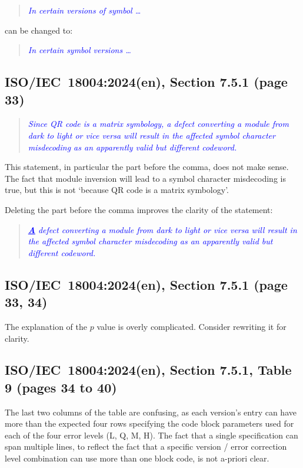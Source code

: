 \documentclass[a4paper,twoside]{article}
\newcommand{\shortstandard}{ISO/IEC~18004}
\newcommand{\standard}{\shortstandard:2024(en)}
\newcommand{\quotestandard}[1]{\textcolor{blue}{\textit{#1}}}
\newcommand{\ddd}{\dots}
\newcommand{\change}[1]{\underline{\textbf{#1}}}
\begin{document}
\begin{quote}
\quotestandard{In certain versions of symbol \ddd}
\end{quote}

can be changed to:

\begin{quote}
\quotestandard{In certain {symbol versions} \ddd}
\end{quote}

\subsection{\standard, Section 7.5.1 (page 33)}

\begin{quote}
\quotestandard{Since QR code is a matrix symbology, a defect converting a module from dark to light or vice versa
will result in the affected symbol character misdecoding as an apparently valid but different codeword.}
\end{quote}

This statement, in particular the part before the comma, does not make sense. The fact that module
inversion will lead to a symbol character misdecoding is true, but this is not `because QR code is a
matrix symbology'.

Deleting the part before the comma improves the clarity of the statement:

\begin{quote}
\quotestandard{\change{A} defect converting a module from dark to light or vice versa will result in the affected symbol
character misdecoding as an apparently valid but different codeword.}
\end{quote}

\subsection{\standard, Section 7.5.1 (page 33, 34)}

The explanation of the $p$ value is overly complicated. Consider rewriting it for clarity.

\subsection{\standard, Section 7.5.1, Table 9 (pages 34 to 40)}

The last two columns of the table are confusing, as each version's entry can have more than the expected
four rows specifying the code block parameters used for each of the four error levels (L, Q, M, H). The
fact that a single specification can span multiple lines, to reflect the fact that a specific
version / error correction level combination can use more than one block code, is not a-priori clear.
\end{document}
